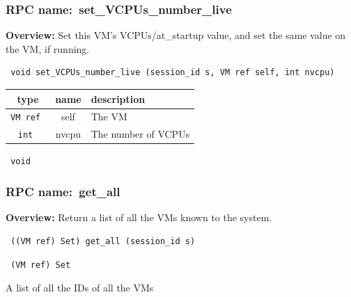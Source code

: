 \vspace{0.6cm}
\subsubsection{RPC name:~set\_VCPUs\_number\_live}

{\bf Overview:} 
Set this VM's VCPUs/at\_startup value, and set the same value on the VM, if
running.

\begin{verbatim} void set_VCPUs_number_live (session_id s, VM ref self, int nvcpu)\end{verbatim}



 
\vspace{0.3cm}
\begin{tabular}{|c|c|p{7cm}|}
 \hline
{\bf type} & {\bf name} & {\bf description} \\ \hline
{\tt VM ref } & self & The VM \\ \hline 

{\tt int } & nvcpu & The number of VCPUs \\ \hline 

\end{tabular}

\vspace{0.3cm}

{\tt 
void
}



\vspace{0.3cm}
\vspace{0.3cm}
\vspace{0.3cm}
\subsubsection{RPC name:~get\_all}

{\bf Overview:} 
Return a list of all the VMs known to the system.

\begin{verbatim} ((VM ref) Set) get_all (session_id s)\end{verbatim}


\vspace{0.3cm}

{\tt 
(VM ref) Set
}


A list of all the IDs of all the VMs
\vspace{0.3cm}
\vspace{0.3cm}
\vspace{0.3cm}

